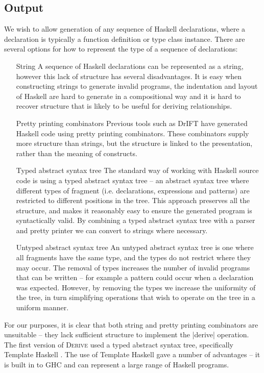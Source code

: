 \documentclass[preprint]{sigplanconf}
\newcommand{\derive}{\textsc{Derive}}
\begin{document}
\subsection{Output}

We wish to allow generation of any sequence of Haskell declarations, where a declaration is typically a function definition or type class instance. There are several options for how to represent the type of a sequence of declarations:

\begin{itemize}
\item[String] A sequence of Haskell declarations can be represented as a string, however this lack of structure has several disadvantages. It is easy when constructing strings to generate invalid programs, the indentation and layout of Haskell are hard to generate in a compositional way and it is hard to recover structure that is likely to be useful for deriving relationships.
\item[Pretty printing combinators] Previous tools such as DrIFT \cite{drift} have generated Haskell code using pretty printing combinators. These combinators supply more structure than strings, but the structure is linked to the presentation, rather than the meaning of constructs.
\item[Typed abstract syntax tree] The standard way of working with Haskell source code is using a typed abstract syntax tree -- an abstract syntax tree where different types of fragment (i.e. declarations, expressions and patterns) are restricted to different positions in the tree. This approach preserves all the structure, and makes it reasonably easy to ensure the generated program is syntactically valid. By combining a typed abstract syntax tree with a parser and pretty printer we can convert to strings where necessary.
\item[Untyped abstract syntax tree] An untyped abstract syntax tree is one where all fragments have the same type, and the types do not restrict where they may occur. The removal of types increases the number of invalid programs that can be written -- for example a pattern could occur when a declaration was expected. However, by removing the types we increase the uniformity of the tree, in turn simplifying operations that wish to operate on the tree in a uniform manner.
\end{itemize}

For our purposes, it is clear that both string and pretty printing combinators are unsuitable -- they lack sufficient structure to implement the |derive| operation. The first version of \derive{} used a typed abstract syntax tree, specifically Template Haskell \cite{template_haskell}. The use of Template Haskell gave a number of advantages -- it is built in to GHC and can represent a large range of Haskell programs.
\end{document}
